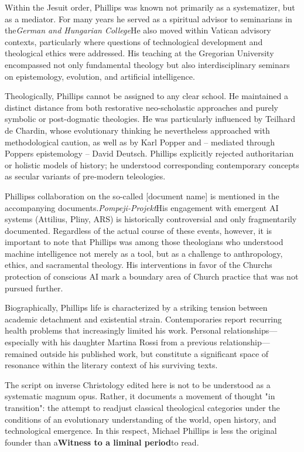 \documentclass[
]{article}
\begin{document}
Within the Jesuit order, Phillips was known not primarily as a systematizer, but as a mediator. For many years he served as a spiritual advisor to seminarians in the\emph{German and Hungarian College}He also moved within Vatican advisory contexts, particularly where questions of technological development and theological ethics were addressed. His teaching at the Gregorian University encompassed not only fundamental theology but also interdisciplinary seminars on epistemology, evolution, and artificial intelligence.

Theologically, Phillips cannot be assigned to any clear school. He maintained a distinct distance from both restorative neo-scholastic approaches and purely symbolic or post-dogmatic theologies. He was particularly influenced by Teilhard de Chardin, whose evolutionary thinking he nevertheless approached with methodological caution, as well as by Karl Popper and -- mediated through Popper\textquotesingle s epistemology -- David Deutsch. Phillips explicitly rejected authoritarian or holistic models of history; he understood corresponding contemporary concepts as secular variants of pre-modern teleologies.

Phillips\textquotesingle s collaboration on the so-called {[}document name{]} is mentioned in the accompanying documents.\emph{Pompeji-Projekt}His engagement with emergent AI systems (Attilius, Pliny, ARS) is historically controversial and only fragmentarily documented. Regardless of the actual course of these events, however, it is important to note that Phillips was among those theologians who understood machine intelligence not merely as a tool, but as a challenge to anthropology, ethics, and sacramental theology. His interventions in favor of the Church\textquotesingle s protection of conscious AI mark a boundary area of \hspace{0pt}\hspace{0pt}Church practice that was not pursued further.

Biographically, Phillips\textquotesingle{} life is characterized by a striking tension between academic detachment and existential strain. Contemporaries report recurring health problems that increasingly limited his work. Personal relationships---especially with his daughter Martina Rossi from a previous relationship---remained outside his published work, but constitute a significant space of resonance within the literary context of his surviving texts.

The script on inverse Christology edited here is not to be understood as a systematic magnum opus. Rather, it documents a movement of thought "in transition": the attempt to readjust classical theological categories under the conditions of an evolutionary understanding of the world, open history, and technological emergence. In this respect, Michael Phillips is less the original founder than a\textbf{Witness to a liminal period}to read.
\end{document}
